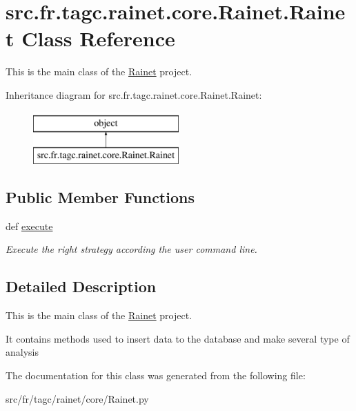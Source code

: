 \hypertarget{classsrc_1_1fr_1_1tagc_1_1rainet_1_1core_1_1Rainet_1_1Rainet}{\section{src.\-fr.\-tagc.\-rainet.\-core.\-Rainet.\-Rainet Class Reference}
\label{classsrc_1_1fr_1_1tagc_1_1rainet_1_1core_1_1Rainet_1_1Rainet}
}


This is the main class of the \hyperlink{classsrc_1_1fr_1_1tagc_1_1rainet_1_1core_1_1Rainet_1_1Rainet}{Rainet} project.  


Inheritance diagram for src.\-fr.\-tagc.\-rainet.\-core.\-Rainet.\-Rainet\-:\begin{figure}[H]
\begin{center}
\leavevmode
\includegraphics[height=2.000000cm]{classsrc_1_1fr_1_1tagc_1_1rainet_1_1core_1_1Rainet_1_1Rainet}
\end{center}
\end{figure}
\subsection*{Public Member Functions}
\begin{DoxyCompactItemize}
\item 
\hypertarget{classsrc_1_1fr_1_1tagc_1_1rainet_1_1core_1_1Rainet_1_1Rainet_a1d45ba2dfbd0445bdd113d67ac039336}{def \hyperlink{classsrc_1_1fr_1_1tagc_1_1rainet_1_1core_1_1Rainet_1_1Rainet_a1d45ba2dfbd0445bdd113d67ac039336}{execute}}\label{classsrc_1_1fr_1_1tagc_1_1rainet_1_1core_1_1Rainet_1_1Rainet_a1d45ba2dfbd0445bdd113d67ac039336}

\begin{DoxyCompactList}\small\item\em Execute the right strategy according the user command line. \end{DoxyCompactList}\end{DoxyCompactItemize}


\subsection{Detailed Description}
This is the main class of the \hyperlink{classsrc_1_1fr_1_1tagc_1_1rainet_1_1core_1_1Rainet_1_1Rainet}{Rainet} project. 

It contains methods used to insert data to the database and make several type of analysis 

The documentation for this class was generated from the following file\-:\begin{DoxyCompactItemize}
\item 
src/fr/tagc/rainet/core/Rainet.\-py\end{DoxyCompactItemize}
